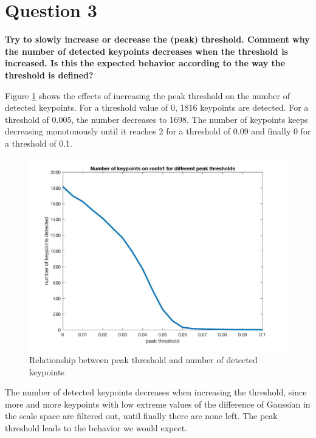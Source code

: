 \section{Question 3}

{\bfseries Try to slowly increase or decrease the (peak) threshold. Comment
why the number of detected keypoints decreases when the threshold is increased.
Is this the expected behavior according to the way the threshold is defined?}


Figure \ref{fig:n_peak_thresh} shows the effects of increasing the peak threshold on the number of detected keypoints. For a threshold value of 0, 1816 keypoints are detected. For a threshold of 0.005, the number decreases to 1698. The number of keypoints keeps decreasing monotonously until it reaches 2 for a threshold of 0.09 and finally 0 for a threshold of 0.1.
\begin{figure}[!hbt]
  \includegraphics[width=\textwidth]{img/n_peak_thresh}
  \caption{Relationship between peak threshold and number of detected keypoints}
  \label{fig:n_peak_thresh}
\end{figure}

The number of detected keypoints decreases when increasing the threshold, since more and more keypoints with low extreme values of the difference of Gaussian in the scale space are filtered out, until finally there are none left. The peak threshold leads to the behavior we would expect. 

